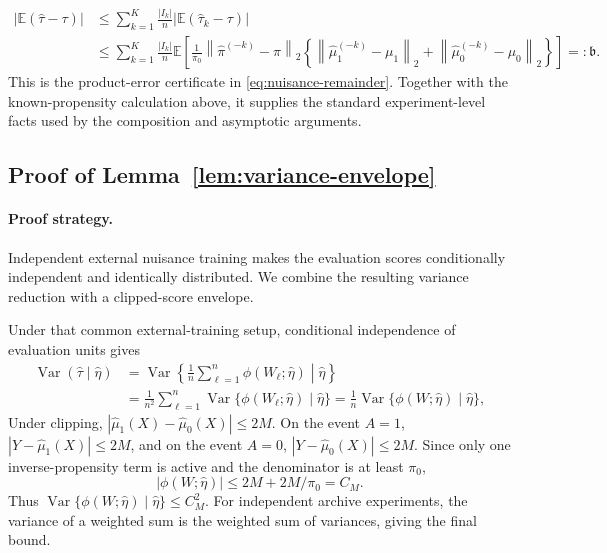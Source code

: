 \documentclass[11pt]{article}
\numberwithin{equation}{section}
\DeclareMathOperator{\Var}{Var}
\newcommand{\E}{\mathbb E}
\newcommand{\1}{\mathbf 1}
\newcommand{\norm}[1]{\left\lVert #1\right\rVert}
\newcommand{\abs}[1]{\left\lvert #1\right\rvert}
\begin{document}
\begin{equation}
\label{eq:app-proof-010}
\begin{aligned}
\abs{\E(\widehat\tau-\tau)}
&\le\sum_{k=1}^K\frac{|I_k|}{n}
\abs{\E(\widehat\tau_k-\tau)}\\
&\le\sum_{k=1}^K\frac{|I_k|}{n}
\E\!\left[
\frac{1}{\pi_0}
\norm{\widehat\pi^{(-k)}-\pi}_{2}
\left\{
\norm{\widehat\mu_1^{(-k)}-\mu_1}_{2}
+\norm{\widehat\mu_0^{(-k)}-\mu_0}_{2}
\right\}
\right]
=:\mathfrak b.
\end{aligned}
\end{equation}
This is the product-error certificate in
\eqref{eq:nuisance-remainder}.  Together with the known-propensity
calculation above, it supplies the standard experiment-level facts used by
the composition and asymptotic arguments.

\subsection{Proof of Lemma~\ref{lem:variance-envelope}}
\label{app:proof-lem-variance}

\paragraph{Proof strategy.} Independent external nuisance training makes the
evaluation scores conditionally independent and identically distributed.
We combine the resulting variance reduction with a clipped-score envelope.

Under that common external-training setup, conditional independence of evaluation units gives
\begin{equation}
\label{eq:app-proof-011}
\begin{aligned}
\Var(\widehat\tau\mid\widehat\eta)
&=\Var\!\left\{
\frac1n\sum_{\ell=1}^n\phi(W_\ell;\widehat\eta)
\middle|\widehat\eta
\right\}\\
&=\frac{1}{n^2}\sum_{\ell=1}^n
\Var\{\phi(W_\ell;\widehat\eta)\mid\widehat\eta\}
=\frac1n\Var\{\phi(W;\widehat\eta)\mid\widehat\eta\},
\end{aligned}
\end{equation}
Under clipping, \(\abs{\widehat\mu_1(X)-\widehat\mu_0(X)}\le2M\).  On the event \(A=1\), \(\abs{Y-\widehat\mu_1(X)}\le2M\), and on the event \(A=0\), \(\abs{Y-\widehat\mu_0(X)}\le2M\).  Since only one inverse-propensity term is active and the denominator is at least \(\pi_0\),
\begin{equation}
\label{eq:app-proof-012}
\abs{\phi(W;\widehat\eta)}\le 2M+2M/\pi_0=C_M.
\end{equation}
Thus \(\Var\{\phi(W;\widehat\eta)\mid\widehat\eta\}\le C_M^2\).  For independent archive experiments, the variance of a weighted sum is the weighted sum of variances, giving the final bound.
\end{document}
